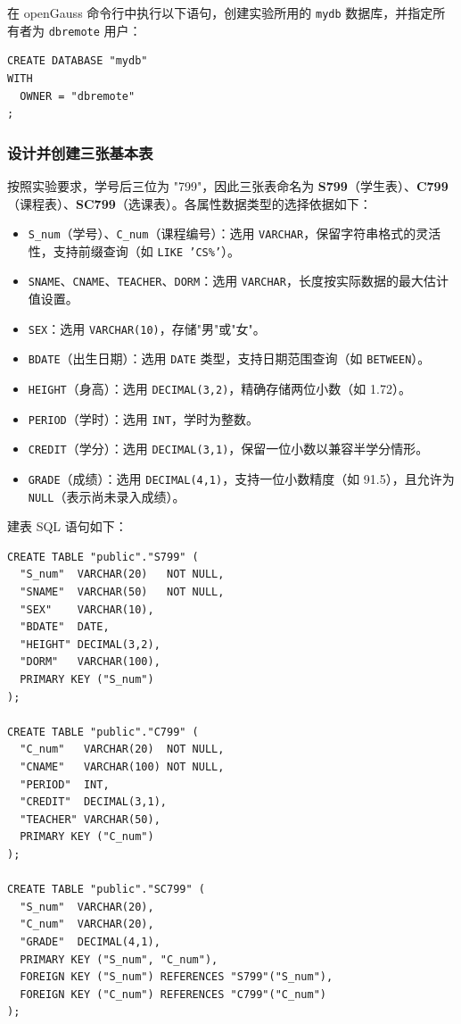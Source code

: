 \documentclass[12pt,a4paper]{ctexart}
\begin{document}
在 openGauss 命令行中执行以下语句，创建实验所用的 \texttt{mydb} 数据库，并指定所有者为 \texttt{dbremote} 用户：

\begin{lstlisting}[style=sqlstyle]
CREATE DATABASE "mydb"
WITH
  OWNER = "dbremote"
;
\end{lstlisting}

\subsubsection{设计并创建三张基本表}

按照实验要求，学号后三位为 "799"，因此三张表命名为 \textbf{S799}（学生表）、\textbf{C799}（课程表）、\textbf{SC799}（选课表）。各属性数据类型的选择依据如下：

\begin{itemize}
  \item \texttt{S\_num}（学号）、\texttt{C\_num}（课程编号）：选用 \texttt{VARCHAR}，保留字符串格式的灵活性，支持前缀查询（如 \texttt{LIKE 'CS\%'}）。
  \item \texttt{SNAME}、\texttt{CNAME}、\texttt{TEACHER}、\texttt{DORM}：选用 \texttt{VARCHAR}，长度按实际数据的最大估计值设置。
  \item \texttt{SEX}：选用 \texttt{VARCHAR(10)}，存储"男"或"女"。
  \item \texttt{BDATE}（出生日期）：选用 \texttt{DATE} 类型，支持日期范围查询（如 \texttt{BETWEEN}）。
  \item \texttt{HEIGHT}（身高）：选用 \texttt{DECIMAL(3,2)}，精确存储两位小数（如 1.72）。
  \item \texttt{PERIOD}（学时）：选用 \texttt{INT}，学时为整数。
  \item \texttt{CREDIT}（学分）：选用 \texttt{DECIMAL(3,1)}，保留一位小数以兼容半学分情形。
  \item \texttt{GRADE}（成绩）：选用 \texttt{DECIMAL(4,1)}，支持一位小数精度（如 91.5），且允许为 \texttt{NULL}（表示尚未录入成绩）。
\end{itemize}

建表 SQL 语句如下：

\begin{lstlisting}[style=sqlstyle]
CREATE TABLE "public"."S799" (
  "S_num"  VARCHAR(20)   NOT NULL,
  "SNAME"  VARCHAR(50)   NOT NULL,
  "SEX"    VARCHAR(10),
  "BDATE"  DATE,
  "HEIGHT" DECIMAL(3,2),
  "DORM"   VARCHAR(100),
  PRIMARY KEY ("S_num")
);

CREATE TABLE "public"."C799" (
  "C_num"   VARCHAR(20)  NOT NULL,
  "CNAME"   VARCHAR(100) NOT NULL,
  "PERIOD"  INT,
  "CREDIT"  DECIMAL(3,1),
  "TEACHER" VARCHAR(50),
  PRIMARY KEY ("C_num")
);

CREATE TABLE "public"."SC799" (
  "S_num"  VARCHAR(20),
  "C_num"  VARCHAR(20),
  "GRADE"  DECIMAL(4,1),
  PRIMARY KEY ("S_num", "C_num"),
  FOREIGN KEY ("S_num") REFERENCES "S799"("S_num"),
  FOREIGN KEY ("C_num") REFERENCES "C799"("C_num")
);
\end{lstlisting}
\end{document}
